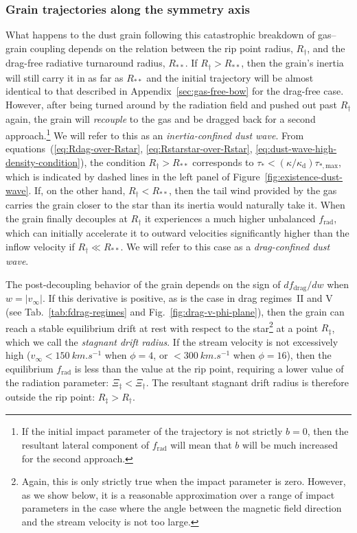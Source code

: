 \message{ !name(dusty-bow-wave.tex)}\documentclass[useAMS, usenatbib, a4paper]{mnras}
\providecommand{\abs}[1]{\lvert#1\rvert}
\newcommand{\grain}{\ensuremath{_{\text{d}}}}
\newcommand\drag{\ensuremath{_{\text{drag}}}}
\newcommand\rad{\ensuremath{_{\text{rad}}}}
\newcommand\starstar{\ensuremath{_{**}}}
\begin{document}
\subsubsection{Grain trajectories along the symmetry axis}
\label{sec:grain-traj-along}

What happens to the dust grain following this catastrophic breakdown
of gas--grain coupling depends on the relation between the rip point
radius, \(R_\dag\), and the drag-free radiative turnaround radius,
\(R\starstar\).  If \(R_\dag > R\starstar\), then the grain's inertia
will still carry it in as far as \(R\starstar\) and the initial
trajectory will be almost identical to that described in
Appendix~\ref{sec:gas-free-bow} for the drag-free case. However, after
being turned around by the radiation field and pushed out past
\(R_\dag\) again, the grain will \emph{recouple} to the gas and be
dragged back for a second approach.\footnote{If the initial impact
  parameter of the trajectory is not strictly \(b = 0\), then the
  resultant lateral component of \(f\rad\) will mean that \(b\) will
  be much increased for the second approach.} %
We will refer to this as an \textit{inertia-confined dust wave}.  From
equations~(\ref{eq:Rdag-over-Rstar}, \ref{eq:Rstarstar-over-Rstar},
\ref{eq:dust-wave-high-density-condition}), the condition
\(R_\dag > R\starstar\) corresponds to
\(\tau_* < (\kappa/\kappa\grain) \tau_{*,\text{max}}\), which is indicated by dashed
lines in the left panel of Figure~\ref{fig:existence-dust-wave}.  If,
on the other hand, \(R_\dag < R\starstar\), then the tail wind provided
by the gas carries the grain closer to the star than its inertia would
naturally take it.  When the grain finally decouples at \(R_\dag\) it
experiences a much higher unbalanced \(f\rad\), which can initially
accelerate it to outward velocities significantly higher than the
inflow velocity if \(R_\dag \ll R\starstar\).  We will refer to this case
as a \textit{drag-confined dust wave}.

The post-decoupling behavior of the grain depends on the sign of
\(d f\drag / d w\) when \(w = \abs{v_\infty}\).  If this derivative is
positive, as is the case in drag regimes~II and V (see
Tab.~\ref{tab:fdrag-regimes} and Fig.~\ref{fig:drag-v-phi-plane}),
then the grain can reach a stable equilibrium drift at rest with
respect to the star\footnote{%
  Again, this is only strictly true when the impact parameter is zero.
  However, as we show below, it is a reasonable approximation over a
  range of impact parameters in the case where the angle between the
  magnetic field direction and the stream velocity is not too
  large.} %
at a point \(R_\ddag\), which we call the \textit{stagnant drift
  radius}. If the stream velocity is not excessively high
(\(v_\infty < \SI{150}{km.s^{-1}}\) when \(\phi = 4\), or
\(< \SI{300}{km.s^{-1}}\) when \(\phi = 16\)), then the equilibrium
\(f\rad\) is less than the value at the rip point, requiring a lower
value of the radiation parameter: \(\Xi_\ddag < \Xi_\dag\).  The resultant
stagnant drift radius is therefore outside the rip point:
\(R_\ddag > R_\dag\).
\end{document}
